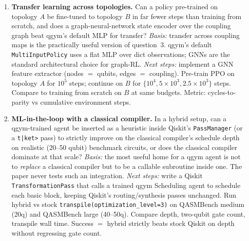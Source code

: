 \begin{enumerate}
\item \textbf{Transfer learning across topologies.}
Can a policy pre-trained on topology $A$ be fine-tuned to topology $B$ in
far fewer steps than training from scratch, and does a graph-neural-network
state encoder over the coupling graph beat qgym's default MLP for transfer?
\emph{Basis:} transfer across coupling maps is the practically useful version
of question~3. qgym's default \texttt{MultiInputPolicy} uses a flat MLP over
dict observations; GNNs are the standard architectural choice for graph-RL.
\emph{Next steps:} implement a GNN feature extractor (nodes $=$ qubits,
edges $=$ coupling). Pre-train PPO on topology $A$ for $10^5$ steps; continue
on $B$ for $\{10^4, 5{\times}10^3, 2.5{\times}10^3\}$ steps. Compare to
training from scratch on $B$ at same budgets. Metric: cycles-to-parity vs
cumulative environment steps.

\item \textbf{ML-in-the-loop with a classical compiler.}
In a hybrid setup, can a qgym-trained agent be inserted as a heuristic inside
Qiskit's \texttt{PassManager} (or a \texttt{t|ket>} pass) to strictly improve
on the classical compiler's schedule depth on realistic (20--50 qubit)
benchmark circuits, or does the classical compiler dominate at that scale?
\emph{Basis:} the most useful home for a qgym agent is not to \emph{replace}
a classical compiler but to be a callable subroutine inside one. The paper
never tests such an integration.
\emph{Next steps:} write a Qiskit \texttt{TransformationPass} that calls a
trained qgym Scheduling agent to schedule each basic block, keeping Qiskit's
routing/synthesis passes unchanged. Run hybrid vs stock
\texttt{transpile(optimization\_level=3)} on QASMBench medium (20q) and
QASMBench large (40--50q). Compare depth, two-qubit gate count, transpile
wall time. Success $=$ hybrid strictly beats stock Qiskit on depth without
regressing gate count.
\end{enumerate}
